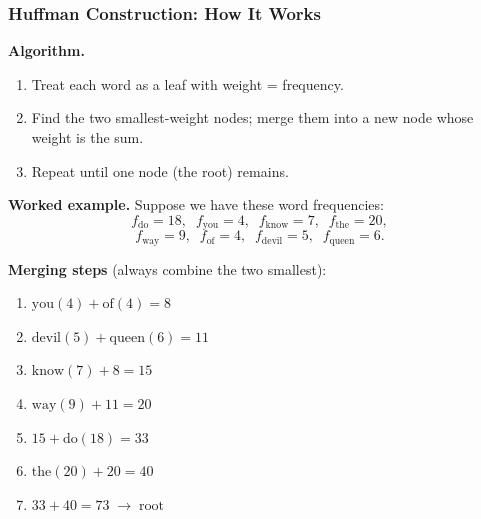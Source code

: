 \documentclass[notes,11pt, aspectratio=169]{beamer}
\begin{document}
\begin{frame}
\frametitle{Huffman Construction: How It Works}

\textbf{Algorithm.}
\begin{enumerate}
    \item Treat each word as a leaf with weight = frequency.
    \item Find the two smallest-weight nodes; merge them into a new node whose weight is the sum.
    \item Repeat until one node (the root) remains.
\end{enumerate}

\vspace{6pt}
\textbf{Worked example.} Suppose we have these word frequencies:
\[
    f_\text{do} = 18, \;\; f_\text{you} = 4, \;\; f_\text{know} = 7, \;\; f_\text{the} = 20,
\]
\[
    f_\text{way} = 9, \;\; f_\text{of} = 4, \;\; f_\text{devil} = 5, \;\; f_\text{queen} = 6.
\]

\vspace{6pt}
\textbf{Merging steps} (always combine the two smallest):
\begin{enumerate}
    \item $\text{you}(4) + \text{of}(4) = 8$
    \item $\text{devil}(5) + \text{queen}(6) = 11$
    \item $\text{know}(7) + 8 = 15$
    \item $\text{way}(9) + 11 = 20$
    \item $15 + \text{do}(18) = 33$
    \item $\text{the}(20) + 20 = 40$
    \item $33 + 40 = 73 \;\to\; \text{root}$
\end{enumerate}
\end{frame}
\end{document}
